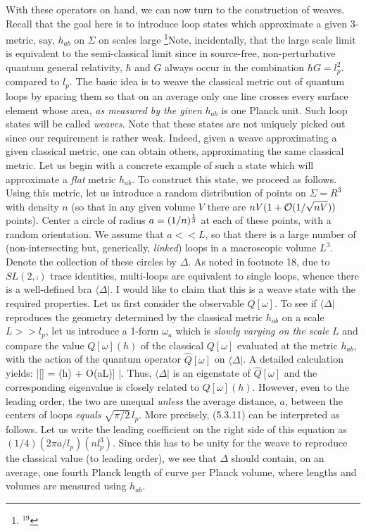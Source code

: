 With these operators on hand, we can now turn to the construction of
weaves. Recall that the goal here is to introduce loop states which
approximate a given 3-metric, say, $h_{ab}$ on $\Sigma$ on scales large
\footnote{$^{19}$}{Note, incidentally, that the large scale limit is equivalent to
the semi-classical limit since in source-free, non-perturbative quantum
general relativity, $\hbar$ and $G$ always occur in the combination
$\hbar G = l_p^2$.}
compared to $l_p$. The basic idea is to weave the classical metric out of
quantum loops by spacing them so that on an average only one line crosses
every surface element whose area, {\it as measured by the given} $h_{ab}$
is one Planck unit. Such loop states will be called {\it weaves}. Note that
these states are not uniquely picked out since our requirement is rather weak.
Indeed, given a weave approximating a given classical metric, one can obtain
others, approximating the same classical metric. Let us begin with a concrete
example of such a state which will approximate a {\it flat} metric $h_{ab}$.
To construct this state, we proceed as follows. Using this metric, let us
introduce a random distribution of points on $\Sigma = R^3$ with density $n$
(so that in any given volume $V$ there are $nV(1+ {\cal O}(1/\sqrt{nV}))$
points). Center a circle of radius $a = (1/n)^{1\over 3}$ at each of these
points, with a random orientation. We assume that $a<< L$, so that there is a
large number of (non-intersecting but, generically, {\it linked}) loops in a
macroscopic volume $L^3$. Denote the collection of these circles by $\Delta$.
As noted in footnote 18, due to $SL(2,\comp )$ trace identities, multi-loops
are equivalent to single loops, whence there is a well-defined bra $\langle
\Delta|$. I would like to claim that this is a weave state with the required
properties. Let us first consider the observable $\hat{Q}[\omega]$. To see if
$\langle\Delta |$ reproduces the geometry determined by the classical metric
$h_{ab}$ on a scale $L>>l_p$, let us introduce a 1-form $\omega_a$ which is
{\it slowly varying on the scale} $L$ and compare the value $Q[\omega](h)$
of the classical $Q[\omega]$ evaluated at the metric $h_{ab}$, with the action
of the quantum operator $\hat{Q}[\omega]$ on $\langle\Delta|$. A detailed
calculation yields:
\bneq
\langle\Delta|\circ {}[\omega] =  \left[{\pi\over 2} \- \
({l_p\over a})^2 \, Q[w](h) + {\cal O}({a\over L})\right]\-  \cdot
\langle\Delta|.
Thus, $\langle\Delta|$ is an eigenstate of $\hat{Q}[\omega ]$ and the
corresponding eigenvalue is closely related to $Q[\omega](h)$. However, even
to the leading order, the two are unequal {\it unless} the average distance,
$a$, between the centers of loops {\it equals} $\sqrt{\pi/2}\, l_p$. More
precisely,  (5.3.11) can be interpreted as follows. Let us write the leading
coefficient on the right side of this equation as $(1/4)(2\pi a/l_p)(nl_p^3)$.
Since this has to be unity for the weave to reproduce the classical value (to
leading order), we see that $\Delta$ should  contain, on an average, one
fourth Planck length of curve per Planck volume, where lengths and volumes are
measured using $h_{ab}$.

